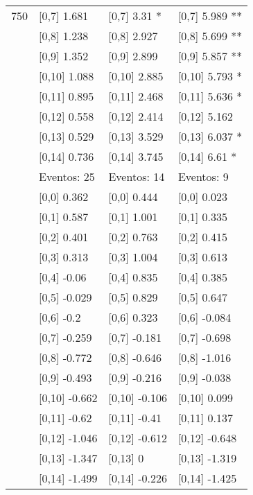 \begin{table}
\begin{tabular}[t]{llll}
750 & {}[0,7] 1.681 & {}[0,7] 3.31 * & {}[0,7] 5.989 **\\
\addlinespace
 & {}[0,8] 1.238 & {}[0,8] 2.927 & {}[0,8] 5.699 **\\
 & {}[0,9] 1.352 & {}[0,9] 2.899 & {}[0,9] 5.857 **\\
 & {}[0,10] 1.088 & {}[0,10] 2.885 & {}[0,10] 5.793 *\\
 & {}[0,11] 0.895 & {}[0,11] 2.468 & {}[0,11] 5.636 *\\
 & {}[0,12] 0.558 & {}[0,12] 2.414 & {}[0,12] 5.162\\
\addlinespace
 & {}[0,13] 0.529 & {}[0,13] 3.529 & {}[0,13] 6.037 *\\
 & {}[0,14] 0.736 & {}[0,14] 3.745 & {}[0,14] 6.61 *\\
 & Eventos:  25 & Eventos:  14 & Eventos:  9\\
 & {}[0,0] 0.362 & {}[0,0] 0.444 & {}[0,0] 0.023\\
 & {}[0,1] 0.587 & {}[0,1] 1.001 & {}[0,1] 0.335\\
\addlinespace
 & {}[0,2] 0.401 & {}[0,2] 0.763 & {}[0,2] 0.415\\
 & {}[0,3] 0.313 & {}[0,3] 1.004 & {}[0,3] 0.613\\
 & {}[0,4] -0.06 & {}[0,4] 0.835 & {}[0,4] 0.385\\
 & {}[0,5] -0.029 & {}[0,5] 0.829 & {}[0,5] 0.647\\
 & {}[0,6] -0.2 & {}[0,6] 0.323 & {}[0,6] -0.084\\
\addlinespace
1000 & {}[0,7] -0.259 & {}[0,7] -0.181 & {}[0,7] -0.698\\
 & {}[0,8] -0.772 & {}[0,8] -0.646 & {}[0,8] -1.016\\
 & {}[0,9] -0.493 & {}[0,9] -0.216 & {}[0,9] -0.038\\
 & {}[0,10] -0.662 & {}[0,10] -0.106 & {}[0,10] 0.099\\
 & {}[0,11] -0.62 & {}[0,11] -0.41 & {}[0,11] 0.137\\
\addlinespace
 & {}[0,12] -1.046 & {}[0,12] -0.612 & {}[0,12] -0.648\\
 & {}[0,13] -1.347 & {}[0,13] 0 & {}[0,13] -1.319\\
 & {}[0,14] -1.499 & {}[0,14] -0.226 & {}[0,14] -1.425\\
\bottomrule
\end{tabular}
\end{table}
